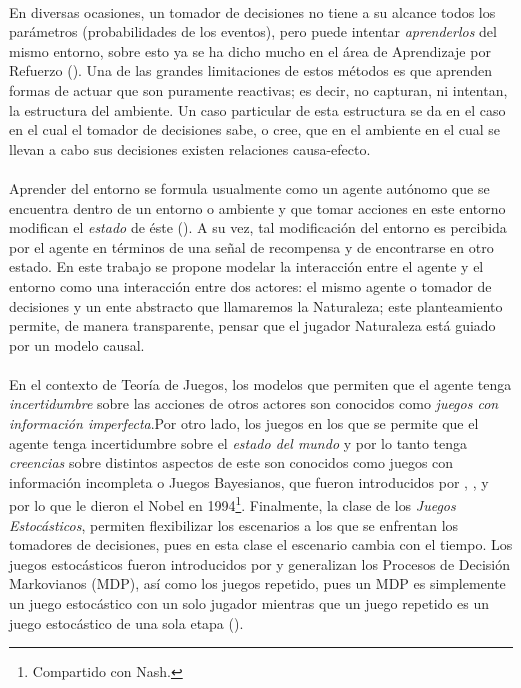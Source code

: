\documentclass[11pt]{article}
\theoremstyle{plain}
\begin{document}
\\
\indent En diversas ocasiones, un tomador de decisiones no tiene a su alcance todos los parámetros (probabilidades de los eventos), pero puede intentar \textit{aprenderlos} del mismo entorno, sobre esto ya se ha dicho mucho en el área de Aprendizaje por Refuerzo (\cite{sutton1998reinforcement}). Una de las grandes limitaciones de estos métodos es que aprenden formas de actuar que son puramente reactivas; es decir, no capturan, ni intentan, la estructura del ambiente. Un caso particular de esta estructura se da en el caso en el cual el tomador de decisiones sabe, o cree, que en el ambiente en el cual se llevan a cabo sus decisiones existen relaciones causa-efecto.\\
\\
\indent Aprender del entorno se formula usualmente como un agente autónomo que se encuentra dentro de un entorno o ambiente y que tomar acciones en este entorno modifican el \textit{estado} de éste (\cite{sutton1998reinforcement}). A su vez, tal modificación del entorno es percibida por el agente en términos de una señal de recompensa y de encontrarse en otro estado. En este trabajo se propone modelar la interacción entre el agente y el entorno como una interacción entre dos actores: el mismo agente o tomador de decisiones y un ente abstracto que llamaremos la Naturaleza; este planteamiento permite, de manera transparente, pensar que el jugador Naturaleza está guiado por un modelo causal.\\
\\
\indent En el contexto de Teoría de Juegos, los modelos que permiten que el agente tenga \textit{incertidumbre} sobre las acciones de otros actores son conocidos como \textit{juegos con información imperfecta}.Por otro lado, los juegos en los que se permite que el agente tenga incertidumbre sobre el \textit{estado del mundo} y por lo tanto tenga \textit{creencias} sobre distintos aspectos de este son conocidos como juegos con información incompleta o Juegos Bayesianos, que fueron introducidos por \cite{harsanyi1967games1}, \cite{harsanyi1968games2}, \cite{harsanyi1968games3} y por lo que le dieron el Nobel en 1994\footnote{Compartido con Nash.}. Finalmente, la clase de los \textit{Juegos Estocásticos}, permiten flexibilizar los escenarios a los que se enfrentan los tomadores de decisiones, pues en esta clase el escenario cambia con el tiempo. Los juegos estocásticos fueron introducidos por \cite{shapley1953stochastic} y generalizan los Procesos de Decisión Markovianos (MDP), así como los juegos repetido, pues un MDP es simplemente un juego estocástico con un solo jugador mientras que un juego repetido es un juego estocástico de una sola etapa (\cite{shoham2008multiagent}).\\
\end{document}
